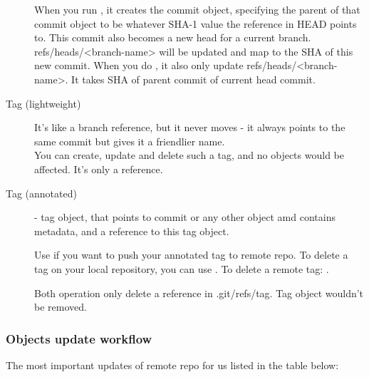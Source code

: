 \begin{description}
  When you run , it creates the commit object,
  specifying the parent of that commit object to be whatever SHA-1 value
  the reference in HEAD points to.
  This commit also becomes a new head for a current branch.
  refs/heads/<branch-name> will be updated and map to the SHA
  of this new commit.
  When you do ,
  it also only update refs/heads/<branch-name>.
  It takes SHA of parent commit of current head commit.
  \item[Tag (lightweight)] It's like a branch reference, but it never moves - it always points to the same commit but gives it a friendlier name.\\
  You can create, update and delete such a tag, and no objects would be affected.
  It's only a reference.
  \item[Tag (annotated)] - tag object, that points to commit or any other object amd contains metadata, and a reference to this tag object.

  Use  if you want to push your annotated tag to remote repo.
  To delete a tag on your local repository, you can use .
  To delete a remote tag: .

  Both operation only delete a reference in .git/refs/tag.
  Tag object wouldn't be removed.
\end{description}

\subsubsection{Objects update workflow}
The most important updates of remote repo for us listed in the table below:

